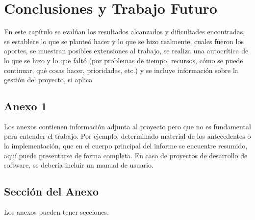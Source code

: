 \documentclass{prgrado}
\begin{document}

\chapter{Conclusiones y Trabajo Futuro}

En este capítulo se evalúan los resultados alcanzados y
dificultades encontradas, se establece lo que se planteó hacer y lo que se hizo
realmente, cuales fueron los aportes, se muestran posibles extensiones al trabajo, se
realiza una autocrítica de lo que se hizo y lo que faltó (por problemas de tiempo,
recursos, cómo se puede continuar, qué cosas hacer, prioridades, etc.) y se incluye
información sobre la gestión del proyecto, si aplica


{ %

\backmatter %


\newpage



} %



\begin{appendix}

\chapter{Anexo 1}

Los anexos contienen información adjunta al proyecto pero que no es fundamental
para entender el trabajo. Por ejemplo, determinado material de los antecedentes o la
implementación, que en el cuerpo principal del informe se encuentre resumido, aquí
puede presentarse de forma completa. En caso de proyectos de desarrollo de
software, se debería incluir un manual de usuario.

\section{Sección del Anexo}

Los anexos pueden tener secciones.

\end{appendix}


\end{document}
